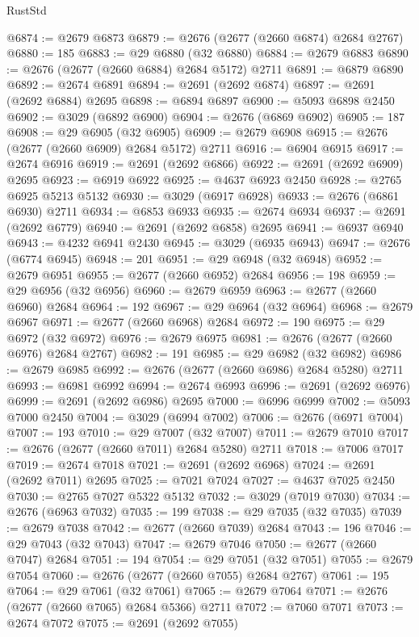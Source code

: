 \begin{lexlean}{RustStd}
\begin{coremodule}
@6874 := @2679 @6873
@6879 := @2676 (@2677 (@2660 @6874) @2684 @2767)
@6880 := 185
@6883 := @29 @6880 (@32 @6880)
@6884 := @2679 @6883
@6890 := @2676 (@2677 (@2660 @6884) @2684 @5172) @2711
@6891 := @6879 @6890
@6892 := @2674 @6891
@6894 := @2691 (@2692 @6874)
@6897 := @2691 (@2692 @6884) @2695
@6898 := @6894 @6897
@6900 := @5093 @6898 @2450
@6902 := @3029 (@6892 @6900)
@6904 := @2676 (@6869 @6902)
@6905 := 187
@6908 := @29 @6905 (@32 @6905)
@6909 := @2679 @6908
@6915 := @2676 (@2677 (@2660 @6909) @2684 @5172) @2711
@6916 := @6904 @6915
@6917 := @2674 @6916
@6919 := @2691 (@2692 @6866)
@6922 := @2691 (@2692 @6909) @2695
@6923 := @6919 @6922
@6925 := @4637 @6923 @2450
@6928 := @2765 @6925 @5213 @5132
@6930 := @3029 (@6917 @6928)
@6933 := @2676 (@6861 @6930) @2711
@6934 := @6853 @6933
@6935 := @2674 @6934
@6937 := @2691 (@2692 @6779)
@6940 := @2691 (@2692 @6858) @2695
@6941 := @6937 @6940
@6943 := @4232 @6941 @2430
@6945 := @3029 (@6935 @6943)
@6947 := @2676 (@6774 @6945)
@6948 := 201
@6951 := @29 @6948 (@32 @6948)
@6952 := @2679 @6951
@6955 := @2677 (@2660 @6952) @2684
@6956 := 198
@6959 := @29 @6956 (@32 @6956)
@6960 := @2679 @6959
@6963 := @2677 (@2660 @6960) @2684
@6964 := 192
@6967 := @29 @6964 (@32 @6964)
@6968 := @2679 @6967
@6971 := @2677 (@2660 @6968) @2684
@6972 := 190
@6975 := @29 @6972 (@32 @6972)
@6976 := @2679 @6975
@6981 := @2676 (@2677 (@2660 @6976) @2684 @2767)
@6982 := 191
@6985 := @29 @6982 (@32 @6982)
@6986 := @2679 @6985
@6992 := @2676 (@2677 (@2660 @6986) @2684 @5280) @2711
@6993 := @6981 @6992
@6994 := @2674 @6993
@6996 := @2691 (@2692 @6976)
@6999 := @2691 (@2692 @6986) @2695
@7000 := @6996 @6999
@7002 := @5093 @7000 @2450
@7004 := @3029 (@6994 @7002)
@7006 := @2676 (@6971 @7004)
@7007 := 193
@7010 := @29 @7007 (@32 @7007)
@7011 := @2679 @7010
@7017 := @2676 (@2677 (@2660 @7011) @2684 @5280) @2711
@7018 := @7006 @7017
@7019 := @2674 @7018
@7021 := @2691 (@2692 @6968)
@7024 := @2691 (@2692 @7011) @2695
@7025 := @7021 @7024
@7027 := @4637 @7025 @2450
@7030 := @2765 @7027 @5322 @5132
@7032 := @3029 (@7019 @7030)
@7034 := @2676 (@6963 @7032)
@7035 := 199
@7038 := @29 @7035 (@32 @7035)
@7039 := @2679 @7038
@7042 := @2677 (@2660 @7039) @2684
@7043 := 196
@7046 := @29 @7043 (@32 @7043)
@7047 := @2679 @7046
@7050 := @2677 (@2660 @7047) @2684
@7051 := 194
@7054 := @29 @7051 (@32 @7051)
@7055 := @2679 @7054
@7060 := @2676 (@2677 (@2660 @7055) @2684 @2767)
@7061 := 195
@7064 := @29 @7061 (@32 @7061)
@7065 := @2679 @7064
@7071 := @2676 (@2677 (@2660 @7065) @2684 @5366) @2711
@7072 := @7060 @7071
@7073 := @2674 @7072
@7075 := @2691 (@2692 @7055)

\end{coremodule}
\end{lexlean}
